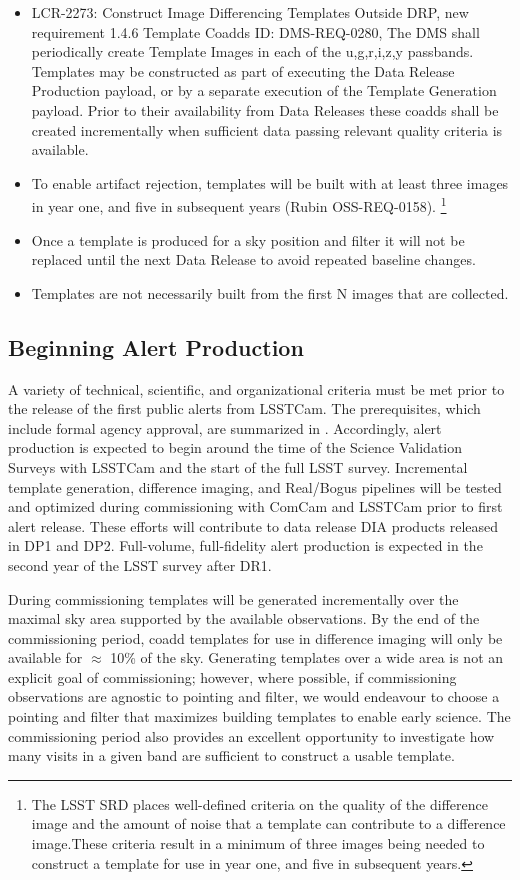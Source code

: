 \begin{itemize}
\item LCR-2273: Construct Image Differencing Templates Outside DRP, new requirement 1.4.6 Template Coadds ID: DMS-REQ-0280, The DMS shall periodically create Template Images in each of the u,g,r,i,z,y passbands. Templates may be constructed as part of executing the Data Release Production payload, or by a separate execution of the Template Generation payload. Prior to their availability from Data Releases these coadds shall be created incrementally when sufficient data passing relevant quality criteria is available.
\item To enable artifact rejection, templates will be built with at least three images in year one, and five in subsequent years (Rubin OSS-REQ-0158). \footnote{The LSST SRD places well-defined criteria on the quality of the difference image and the amount of noise that a template can contribute to a difference image.These criteria result in a minimum of three images being needed to construct a template for use in year one, and five in subsequent years.}
\item Once a template is produced for a sky position and filter it will not be replaced until the next Data Release to avoid repeated baseline changes.
\item Templates are not necessarily built from the first N images that are collected.
\end{itemize}


\subsection{Beginning Alert Production} \label{sec:alerts_start}

A variety of technical, scientific, and organizational criteria must be met prior to the release of the first public alerts from LSSTCam.
The prerequisites, which include formal agency approval, are summarized in .
Accordingly, alert production is expected to begin around the time of the Science Validation Surveys with LSSTCam and the start of the full LSST survey.
Incremental template generation, difference imaging, and Real/Bogus pipelines will be tested and optimized during commissioning with ComCam and LSSTCam prior to first alert release.
These efforts will contribute to data release DIA products released in DP1 and DP2.
Full-volume, full-fidelity alert production is expected in the second year of the LSST survey after DR1. 

During commissioning templates will be generated incrementally over the maximal sky area supported by the available observations.
By the end of the commissioning period, coadd templates for use in difference imaging will only be available for $\approx$ 10\% of the sky.
Generating templates over a wide area is not an explicit goal of commissioning;  however, where possible, if commissioning observations are agnostic to pointing and filter, we would endeavour to choose a pointing and filter that maximizes building templates to enable early science.
The commissioning period also provides an excellent opportunity to investigate how many visits in a given band are sufficient to construct a usable template.

